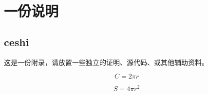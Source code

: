 \chapter{一份说明}

\section{ceshi}

这是一份附录，请放置一些独立的证明、源代码、或其他辅助资料。

\begin{equation}
    C = 2 \pi r
\end{equation}

\begin{equation}
    S = 4 \pi r^2
\end{equation}

\cleardoublepage
\endinput